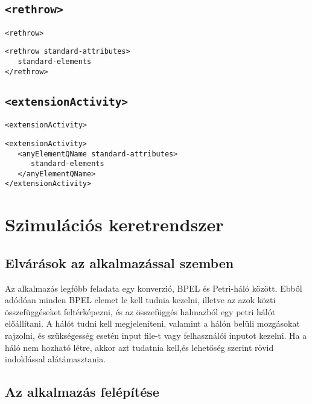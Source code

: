 \documentclass[12pt,a4paper]{book}
\begin{document}
\section{\texttt{<rethrow>}}
\texttt{<rethrow>}
\begin{verbatim}
<rethrow standard-attributes>
   standard-elements
</rethrow>
\end{verbatim}

\section{\texttt{<extensionActivity>}}
\texttt{<extensionActivity>}
\begin{verbatim}
<extensionActivity>
   <anyElementQName standard-attributes>
      standard-elements
   </anyElementQName>
</extensionActivity>
\end{verbatim}


\chapter{Szimulációs keretrendszer}


\section{Elvárások az alkalmazással szemben}

Az alkalmazás legfőbb feladata egy konverzió, BPEL és Petri-háló között. Ebből adódóan minden BPEL elemet le kell tudnia kezelni, illetve az azok közti összefüggéseket feltérképezni, és az összefüggés halmazból egy petri hálót előállítani. A hálót tudni kell megjeleníteni, valamint a hálón belüli mozgásokat rajzolni, és szükségesség esetén input file-t vagy felhasználói inputot kezelni. Ha a háló nem hozható létre, akkor azt tudatnia kell,és lehetőség szerint rövid indoklással alátámasztania. 

\section{Az alkalmazás felépítése}
\end{document}
